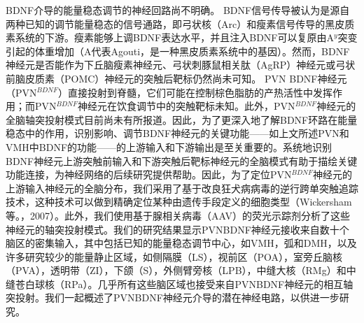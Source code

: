 BDNF介导的能量稳态调节的神经回路尚不明确。 BDNF信号传导被认为是源自两种已知的调节能量稳态的信号通路\citep{waterson2015neuronal, krashes2016melanocortin}，即弓状核（Arc）\citep{xu2003brain}和瘦素信号传导\citep{liao2012dendritically}的黑皮质素系统的下游。瘦素能够上调BDNF表达水平，并且注入BDNF可以复原由A$^{y}$突变引起的体重增加（A代表Agouti，是一种黑皮质素系统中的基因）。然而，BDNF神经元是否能作为下丘脑瘦素神经元、弓状刺豚鼠相关肽（AgRP）神经元或弓状前脑皮质素（POMC）神经元的突触后靶标仍然尚未可知。 PVN BDNF神经元（PVN$^{BDNF}$）直接投射到脊髓，它们可能在控制棕色脂肪的产热活性中发挥作用；而PVN$^{BDNF}$神经元在饮食调节中的突触靶标未知\citep{an2015discrete}。此外，PVN$^{BDNF}$神经元的全脑轴突投射模式目前尚未有所报道。因此，为了更深入地了解BDNF环路在能量稳态中的作用，识别影响、调节BDNF神经元的关键功能——如上文所述PVN和VMH中BDNF的功能——的上游输入和下游输出是至关重要的。系统地识别BDNF神经元上游突触前输入和下游突触后靶标神经元的全脑模式有助于描绘关键功能连接，为神经网络的后续研究提供帮助。因此，为了定位PVN$^{BDNF}$神经元的上游输入神经元的全脑分布，我们采用了基于改良狂犬病病毒的逆行跨单突触追踪技术，这种技术可以做到精确定位某种由遗传手段定义的细胞类型（Wickersham等。，2007）。此外，我们使用基于腺相关病毒（AAV）的荧光示踪剂分析了这些神经元的轴突投射模式。我们的研究结果显示PVNBDNF神经元接收来自数十个脑区的密集输入，其中包括已知的能量稳态调节中心，如VMH，弧和DMH，以及许多研究较少的能量静止区域，如侧隔膜（LS），视前区（POA），室旁丘脑核（PVA），透明带（ZI），下颌（S），外侧臂旁核（LPB），中缝大核（RMg）和中缝苍白球核（RPa）。几乎所有这些脑区域也接受来自PVNBDNF神经元的相互轴突投射。我们一起概述了PVNBDNF神经元介导的潜在神经电路，以供进一步研究。
